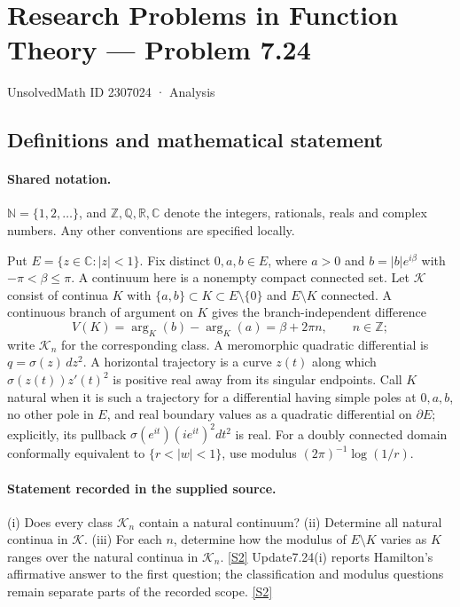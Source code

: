 \documentclass[11pt]{article}
\newcommand{\sref}[2]{\hyperlink{source:#1:#2}{[S#2]}}
\begin{document}
\setcounter{section}{2307023}
\section{Research Problems in Function Theory — Problem 7.24}\label{2307024}
{\small\sffamily UnsolvedMath ID 2307024 · Analysis}
\subsection{Definitions and mathematical statement}

\paragraph{Shared notation.}$\mathbb N=\{1,2,\ldots\}$, and $\mathbb Z,\mathbb Q,\mathbb R,\mathbb C$ denote the integers, rationals, reals and complex numbers. Any other conventions are specified locally.


Put $E=\{z\in\mathbb C:|z|<1\}$. Fix distinct $0,a,b\in E$, where $a>0$ and $b=|b|e^{i\beta}$ with $-\pi<\beta\le\pi$. A continuum here is a nonempty compact connected set. Let $\mathcal K$ consist of continua $K$ with $\{a,b\}\subset K\subset E\setminus\{0\}$ and $E\setminus K$ connected. A continuous branch of argument on $K$ gives the branch-independent difference
\[V(K)=\arg_K(b)-\arg_K(a)=\beta+2\pi n,\qquad n\in\mathbb Z;\]
write $\mathcal K_n$ for the corresponding class. A meromorphic quadratic differential is $q=\sigma(z)\,dz^2$. A horizontal trajectory is a curve $z(t)$ along which $\sigma(z(t))z'(t)^2$ is positive real away from its singular endpoints. Call $K$ natural when it is such a trajectory for a differential having simple poles at $0,a,b$, no other pole in $E$, and real boundary values as a quadratic differential on $\partial E$; explicitly, its pullback $\sigma(e^{it})(ie^{it})^2dt^2$ is real. For a doubly connected domain conformally equivalent to $\{r<|w|<1\}$, use modulus $(2\pi)^{-1}\log(1/r)$.

\paragraph{Statement recorded in the supplied source.}
(i) Does every class $\mathcal K_n$ contain a natural continuum?
(ii) Determine all natural continua in $\mathcal K$.
(iii) For each $n$, determine how the modulus of $E\setminus K$ varies as $K$ ranges over the natural continua in $\mathcal K_n$. \sref{2307024}{2}
Update7.24(i) reports Hamilton's affirmative answer to the first question; the classification and modulus questions remain separate parts of the recorded scope. \sref{2307024}{2}
\end{document}

